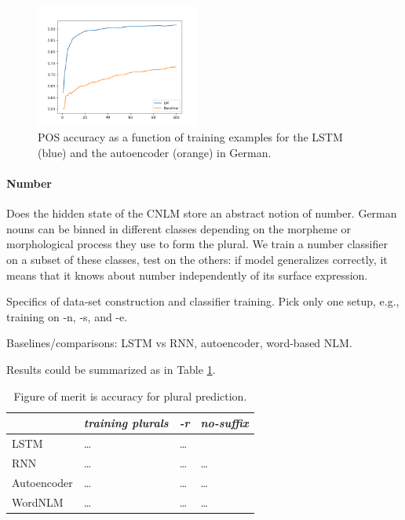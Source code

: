 
\begin{figure}
\includegraphics[width=0.48\textwidth]{figures/german_pos_nouns_verbs.png}
	\caption{POS accuracy as a function of training examples for the LSTM (blue) and the autoencoder (orange) in German.}\label{fig:pos-induction}
\end{figure}





\paragraph{Number}

Does the hidden state of the CNLM store an abstract notion of
number. German nouns can be binned in different classes depending on
the morpheme or morphological process they use to form the plural. We
train a number classifier on a subset of these classes, test on the
others: if model generalizes correctly, it means that it knows about
number independently of its surface expression.

Specifics of data-set construction and classifier training. Pick only one setup, e.g., training on -n, -s, and -e.

Baselines/comparisons: LSTM vs RNN, autoencoder, word-based NLM.

Results could be summarized as in Table \ref{tab:number-results}.


\begin{table}[t]
  \begin{center}
    \begin{tabular}{l|l|l|l}
      \multicolumn{1}{c}{}&\emph{training plurals}&\emph{-r}&\emph{no-suffix}\\
      \hline
      LSTM&\ldots&\ldots\\
      RNN&\ldots&\ldots&\ldots\\
      Autoencoder&\ldots&\ldots&\ldots\\
      WordNLM&\ldots&\ldots&\ldots\\
    \end{tabular}
  \end{center}
  \caption{\label{tab:number-results} Figure of merit is accuracy for plural prediction.}
\end{table}


